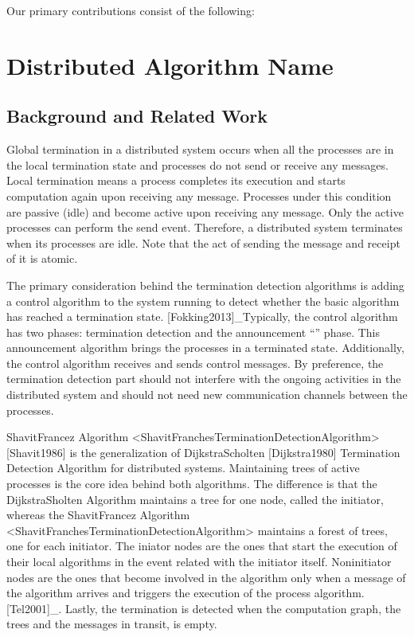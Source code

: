 \documentclass[letterpaper,10pt,english]{sphinxmanual}
\begin{document}
\sphinxAtStartPar
Our primary contributions consist of the following:

\sphinxstepscope


\section{Distributed Algorithm Name}
\label{\detokenize{docs/ShavitFranchezAlg/algorithm:shavitfranchezalg}}\label{\detokenize{docs/ShavitFranchezAlg/algorithm::doc}}

\subsection{Background and Related Work}
\label{\detokenize{docs/ShavitFranchezAlg/algorithm:background-and-related-work}}
\sphinxAtStartPar
Global termination in a distributed system occurs when all the processes are in the local termination state and processes do not send or receive any messages. Local termination means a process completes its execution and starts computation again upon receiving any message. Processes under this condition are passive (idle) and become active upon receiving any message. Only the active processes can perform the send event. Therefore, a distributed system terminates when its processes are idle. Note that the act of sending the message and receipt of it is atomic.

\sphinxAtStartPar
The primary consideration behind the termination detection algorithms is adding a control algorithm to the system running to detect whether the basic algorithm has reached a termination state. {[}Fokking2013{]}\_Typically, the control algorithm has two phases: termination detection and the announcement “” phase. This announcement algorithm brings the processes in a terminated state. Additionally, the control algorithm receives and sends control messages.  By preference, the termination detection part should not interfere with the ongoing activities in the distributed system and should not need new communication channels between the processes.

\sphinxAtStartPar
Shavit\sphinxhyphen{}Francez Algorithm \textless{}ShavitFranchesTerminationDetectionAlgorithm\textgreater{} {[}Shavit1986{]} is the generalization of Dijkstra\sphinxhyphen{}Scholten {[}Dijkstra1980{]} Termination Detection Algorithm for distributed systems. Maintaining trees of active processes is the core idea behind both algorithms. The difference is that the Dijkstra\sphinxhyphen{}Sholten Algorithm maintains a tree for one node, called the initiator, whereas the Shavit\sphinxhyphen{}Francez Algorithm \textless{}ShavitFranchesTerminationDetectionAlgorithm\textgreater{} maintains a forest of trees, one for each initiator. The iniator nodes are the ones that start the execution of their local algorithms in the event related with the initiator itself. Non\sphinxhyphen{}initiator nodes are the ones that become involved in the algorithm only when a message of the algorithm arrives and triggers the execution of the process algorithm.{[}Tel2001{]}\_. Lastly, the termination is detected when the computation graph, the trees and the messages in transit, is empty.
\end{document}

